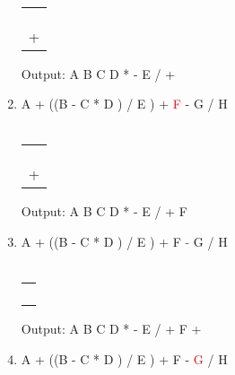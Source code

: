 \documentclass[a4paper]{article}
\begin{document}
\begin{large}
\begin{enumerate}
          \\
          \begin{tabular}[t]{ | p{1em} | }
            \makecell{} \\ \hline
            \makecell{} \\ \hline
            \makecell{} \\ \hline
            \\ \hline
            +           \\ \hline
          \end{tabular}
          \hspace{2em}
          Output: A B C D * - E / +
    \item
          A + ((B - C * D ) / E ) + \textcolor{red}{F} - G / H\\
          \\
          \begin{tabular}[t]{ | p{1em} | }
            \makecell{} \\ \hline
            \makecell{} \\ \hline
            \makecell{} \\ \hline
            \\ \hline
            +           \\ \hline
          \end{tabular}
          \hspace{2em}
          Output: A B C D * - E / + F
          \newpage
    \item
          A + ((B - C * D ) / E ) + F \textcolor{red}{-} G / H\\
          \\
          \begin{tabular}[t]{ | p{1em} | }
            \makecell{}  \\ \hline
            \makecell{}  \\ \hline
            \makecell{}  \\ \hline
            \\ \hline
            \makecell{-} \\ \hline
          \end{tabular}
          \hspace{2em}
          Output: A B C D * - E / + F +
    \item
          A + ((B - C * D ) / E ) + F - \textcolor{red}{G} / H\\
          \\
          \begin{tabular}[t]{ | p{1em} | }

\end{tabular}
\end{enumerate}
\end{large}
\end{document}
